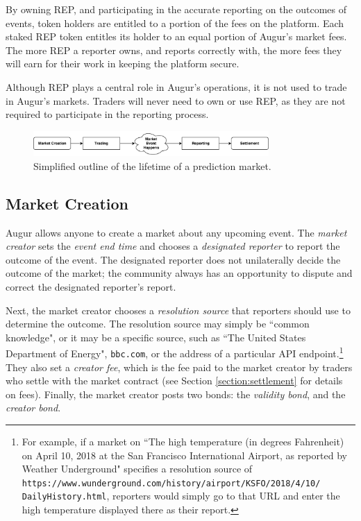 \documentclass[floatfix,reprint,nofootinbib,amsmath,amssymb,epsfig,pre,floats,letterpaper,groupedaffiliation]{revtex4-1}
\theoremstyle{definition}
\theoremstyle{definition}
\begin{document}
By owning REP, and participating in the accurate reporting on the outcomes of events, token holders are entitled to a portion of the fees on the platform.  Each staked REP token entitles its holder to an equal portion of Augur's market fees.  The more REP a reporter owns, and reports correctly with, the more fees they will earn for their work in keeping the platform secure.

Although REP plays a central role in Augur's operations, it is not used to trade in Augur's markets. Traders will never need to own or use REP, as they are not required to participate in the reporting process.

\begin{figure}
\includegraphics[width=0.8\textwidth]{overview.pdf}
\caption{Simplified outline of the lifetime of a prediction market.}
\label{fig:overview}
\end{figure}

\subsection{Market Creation}

Augur allows anyone to create a market about any upcoming event. The \textit{market creator} sets the \textit{event end time} and chooses a \textit{designated reporter} to report the outcome of the event.  The designated reporter does not unilaterally decide the outcome of the market; the community always has an opportunity to dispute and correct the designated reporter's report.

Next, the market creator chooses a \textit{resolution source} that reporters should use to determine the outcome.  The resolution source may simply be ``common knowledge", or it may be a specific source, such as ``The United States Department of Energy", \texttt{bbc.com}, or the address of a particular API endpoint.\footnote{For example, if a market on ``The high temperature (in degrees Fahrenheit) on April 10, 2018 at the San Francisco International Airport, as reported by Weather Underground" specifies a resolution source of \texttt{https://www.wunderground.com/history/airport/KSFO/2018/4/10/ DailyHistory.html}, reporters would simply go to that URL and enter the high temperature displayed there as their report.}  They also set a \textit{creator fee}, which is the fee paid to the market creator by traders who settle with the market contract (see Section \ref{section:settlement} for details on fees).  Finally, the market creator posts two bonds: the \textit{validity bond}, and the \textit{creator bond}.
\end{document}
